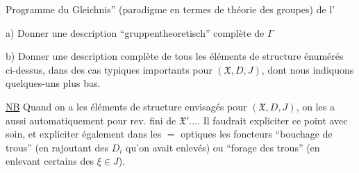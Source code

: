 Programme du   Gleichnis'' (paradigme en termes de théorie des groupes) de l'

a) Donner une description ``gruppentheoretisch'' complète de $\Gamma$

b) Donner une description complète de tous les éléments de structure énumérés ci-dessus, dans des cas typiques importants pour $(\mathfrak X,D,J)$, dont nous indiquons quelques-uns plus bas.


\uline{NB} Quand on a les éléments de structure envisagés pour $(\mathfrak X,D,J)$, on les a aussi automatiquement pour  rev.  fini de $\mathfrak X'....$ Il faudrait expliciter ce point avec soin, et expliciter également dans les $=$ optiques les foncteurs ``bouchage de trous'' (en rajoutant  des $D_i$ qu'on avait enlevés) ou ``forage des trous''  (en enlevant certains des $\xi\in J$).
